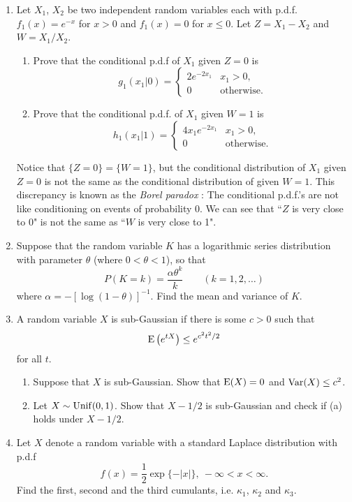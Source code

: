 \documentclass[12pt]{article}
\begin{document}
\begin{enumerate}
\item Let $X_1$, $X_2$ be two independent random variables each with p.d.f. $f_1(x)=e^{-x}$ for $x>0$ and $f_1(x)=0$ for $x \leq 0$. Let $Z = X_1 -X_2$ and $W=X_1/X_2$.
\begin{enumerate}
\item Prove that the conditional p.d.f of $X_1$ given $Z=0$ is
\[
 g_1(x_1 |0) = \left\{
 \begin{array}{ll}
 2 e^{-2x_1} & \mbox{$x_1 > 0$}, \\
 0 & \mbox{otherwise}.
 \end{array}
 \right.
\]
\item Prove that the conditional p.d.f. of $X_1$ given $W=1$ is
\[
 h_1 (x_1 | 1) = \left\{
 \begin{array}{ll}
 4 x_1 e^{-2x_1} & \mbox{$x_1 > 0$}, \\
 0 & \mbox{otherwise}.
 \end{array}
 \right.
\]
\end{enumerate}
Notice that $\{Z=0\} = \{W=1\}$, but the conditional distribution of $X_1$ given $Z=0$ is not the same as the conditional distribution of given $W=1$. This discrepancy is known as the {\em Borel paradox} : The conditional p.d.f.'s are not like conditioning on events of probability 0. We can see that ``$Z$ is very close to 0" is not the same as ``$W$ is very close to 1".


\item 
 Suppose that the random variable $K$ has a logarithmic series
distribution with parameter $\theta$ (where $0<\theta<1$), so that
\[ P(K=k) = \frac{\alpha\theta^k}{k}\qquad(k=1,2,\dots) \]
where $\alpha=-[\log(1-\theta)]^{-1}$. %
Find the mean and variance of $K$.

\item  A random variable $X$ is sub-Gaussian if there is some $c>0$ such that
\[
{\rm E}\left( e^{tX} \right) \leq e^{c^2 t^2/2}
\]
for all $t$. 
\begin{enumerate}
\item Suppose that $X$ is sub-Gaussian. Show that ${\rm E}(X)=0$ and ${\rm Var}(X) \leq c^2$.
\item Let $X \sim {\rm Unif}(0,1)$. Show that $X-1/2$ is sub-Gaussian and check if (a) holds under $X-1/2$. 
\end{enumerate}


\item Let $X$ denote a random variable with a standard Laplace distribution with p.d.f
\[
 f(x) = \frac{1}{2} \exp\{-|x|\},~-\infty < x < \infty.
\]
Find the first, second and the third cumulants, i.e. $\kappa_1$, $\kappa_2$ and $\kappa_3$.

\end{enumerate}
\end{document}
